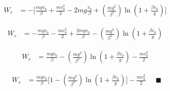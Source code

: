 \documentclass[a4paper,12pt]{article}
\begin{document}
\begin{flushleft}
\[
\begin{aligned}
W_r &= - \Bigg[ 
\frac{m g v_0 }{\beta}  + \frac{m v_0^2}{2}
- 2 mg\frac{v_0}{\beta} 
+ \left(\frac{m g^2}{\beta^2}\right)\ln \left( 1 + \frac{\beta v_0}{g} \right)
\Bigg]
\end{aligned}
\]

\[
\begin{aligned}
W_r &= 
- \frac{m g v_0 }{\beta} - \frac{m v_0^2}{2}
+ \frac{2 mg v_0}{\beta} 
- \left(\frac{m g^2}{\beta^2}\right)\ln \left( 1 + \frac{\beta v_0}{g} \right)
\end{aligned}
\]

\[
\begin{aligned}
W_r &= 
\frac{m g v_0 }{\beta}
- \left(\frac{m g^2}{\beta^2}\right)\ln \left( 1 + \frac{\beta v_0}{g} \right) - \frac{m v_0^2}{2}
\end{aligned}
\]

\[
\boxed{
\begin{aligned}
W_r &=  \frac{m g v_0 }{\beta} \Bigg[1 - \left(\frac{m g^2}{\beta^2}\right)\ln \left( 1 + \frac{\beta v_0}{g} \right) \Bigg] - \frac{m v_0^2}{2}
\end{aligned}
}
\quad \blacksquare
\]


\end{flushleft}




\newpage 
\end{document}
